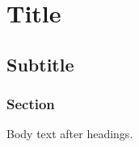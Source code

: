 \section{Title}\label{title}
\subsection{Subtitle}\label{subtitle}
\subsubsection{Section}\label{section}
Body text after headings.

